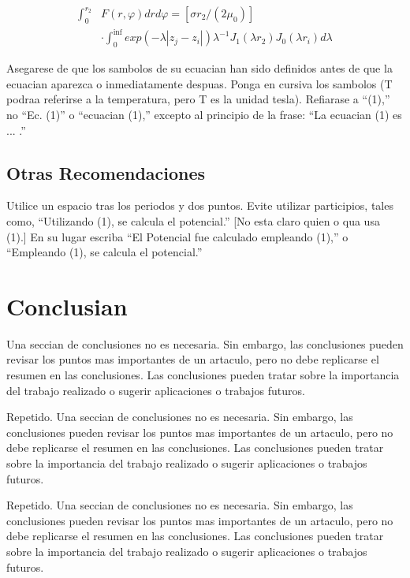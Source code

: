 \documentclass[5p,times,authoryear]{elsarticle}
\begin{document}
\begin{equation} \label{e2}
\begin{array}{ll}
\int_0^{r_2} & F (r, \varphi ) dr d\varphi = [\sigma r_2 / (2 \mu_0 )] \\
& \cdot \int_0^{\inf} exp(-\lambda |z_j - z_i |) \lambda^{-1} J_1 (\lambda  r_2 ) J_0 (\lambda r_i ) d\lambda
\end{array}
\end{equation}

Asegarese de que los sambolos de su ecuacian han sido definidos
antes de que la ecuacian aparezca o inmediatamente despuas. Ponga en
cursiva los sambolos (T podraa referirse a la temperatura, pero T es
la unidad tesla). Refiarase a ``(1),'' no ``Ec. (1)'' o ``ecuacian
(1),'' excepto al principio de la frase: ``La ecuacian (1) es ...
.''

\subsection{Otras Recomendaciones}

Utilice un espacio tras los periodos y dos puntos. Evite utilizar
participios, tales como, ``Utilizando (1), se calcula el
potencial.'' [No esta claro quien o qua usa (1).] En su lugar
escriba ``El Potencial fue calculado empleando (1),'' o ``Empleando
(1), se calcula el potencial.''

\section{Conclusian}

Una seccian de conclusiones no es necesaria. Sin embargo, las conclusiones pueden revisar los puntos mas importantes de un artaculo, pero no debe replicarse el resumen en las conclusiones. Las conclusiones pueden tratar sobre la importancia del trabajo realizado o sugerir aplicaciones o trabajos futuros.

Repetido. Una seccian de conclusiones no es necesaria. Sin embargo, las conclusiones pueden revisar los puntos mas importantes de un artaculo, pero no debe replicarse el resumen en las conclusiones. Las conclusiones pueden tratar sobre la importancia del trabajo realizado o sugerir aplicaciones o trabajos futuros.

Repetido. Una seccian de conclusiones no es necesaria. Sin embargo, las conclusiones pueden revisar los puntos mas importantes de un artaculo, pero no debe replicarse el resumen en las conclusiones. Las conclusiones pueden tratar sobre la importancia del trabajo realizado o sugerir aplicaciones o trabajos futuros.
\end{document}
